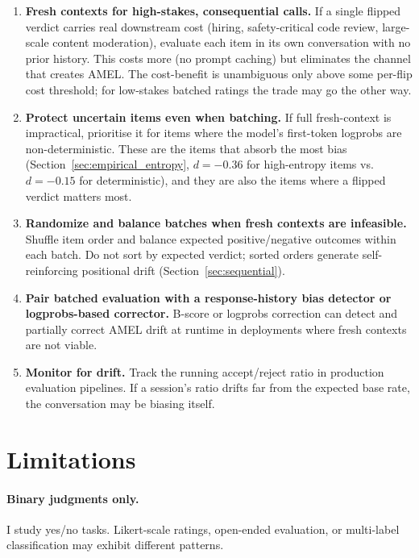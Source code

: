 \documentclass[10pt,twocolumn]{article}
\begin{document}
\begin{enumerate}
    \item \textbf{Fresh contexts for high-stakes, consequential calls.} If a single flipped verdict carries real downstream cost (hiring, safety-critical code review, large-scale content moderation), evaluate each item in its own conversation with no prior history. This costs more (no prompt caching) but eliminates the channel that creates AMEL. The cost-benefit is unambiguous only above some per-flip cost threshold; for low-stakes batched ratings the trade may go the other way.

    \item \textbf{Protect uncertain items even when batching.} If full fresh-context is impractical, prioritise it for items where the model's first-token logprobs are non-deterministic. These are the items that absorb the most bias (Section~\ref{sec:empirical_entropy}, $d = -0.36$ for high-entropy items vs.\ $d = -0.15$ for deterministic), and they are also the items where a flipped verdict matters most.

    \item \textbf{Randomize and balance batches when fresh contexts are infeasible.} Shuffle item order and balance expected positive/negative outcomes within each batch. Do not sort by expected verdict; sorted orders generate self-reinforcing positional drift (Section~\ref{sec:sequential}).

    \item \textbf{Pair batched evaluation with a response-history bias detector or logprobs-based corrector.} B-score \citep{bscore2025} or logprobs correction \citep{bhatt2026rbcorr} can detect and partially correct AMEL drift at runtime in deployments where fresh contexts are not viable.

    \item \textbf{Monitor for drift.} Track the running accept/reject ratio in production evaluation pipelines. If a session's ratio drifts far from the expected base rate, the conversation may be biasing itself.
\end{enumerate}


\section{Limitations}
\label{sec:limitations}

\paragraph{Binary judgments only.}
I study yes/no tasks.
Likert-scale ratings, open-ended evaluation, or multi-label classification may exhibit different patterns.
\end{document}
